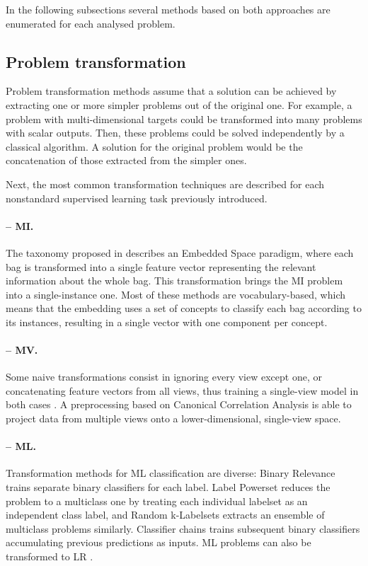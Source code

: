 In the following subsections several methods based on both approaches are enumerated for each analysed problem.

\subsection{Problem transformation}

Problem transformation methods assume that a solution can be achieved by extracting one or more simpler problems out of the original one. For example, a problem with multi-dimensional targets could be transformed into many problems with scalar outputs. Then, these problems could be solved independently by a classical algorithm. A solution for the original problem would be the concatenation of those extracted from the simpler ones.

Next, the most common transformation techniques are described for each nonstandard supervised learning task previously introduced.


\paragraph{-- MI.} 
The taxonomy proposed in \cite{mic-taxonomy} describes an Embedded Space paradigm, where each bag is transformed into a single feature vector representing the relevant information about the whole bag. This transformation brings the MI problem into a single-instance one. Most of these methods are voca\-bulary-based, which means that the embedding uses a set of concepts to classify each bag according to its instances, resulting in a single vector with one component per concept.

\paragraph{-- MV.} Some naive transformations consist in ignoring every view except one, or concatenating feature vectors from all views, thus training a single-view model in both cases \cite{mv-spectral}. A preprocessing based on Canonical Correlation Analysis \cite{mv-cca} is able to project data from multiple views onto a lower-dimensional, single-view space.

\paragraph{-- ML.} 
Transformation methods for ML classification \cite{mlmethods} are diverse: Binary Relevance trains separate binary classifiers for each label. Label Powerset reduces the problem to a multiclass one by treating each individual labelset as an independent class label, and Random k-Labelsets \cite{ml-rakel} extracts an ensemble of multiclass problems similarly. Classifier chains \cite{ml-chains} trains subsequent binary classifiers accumulating previous predictions as inputs. ML problems can also be transformed to LR \cite{ml-clr}.

